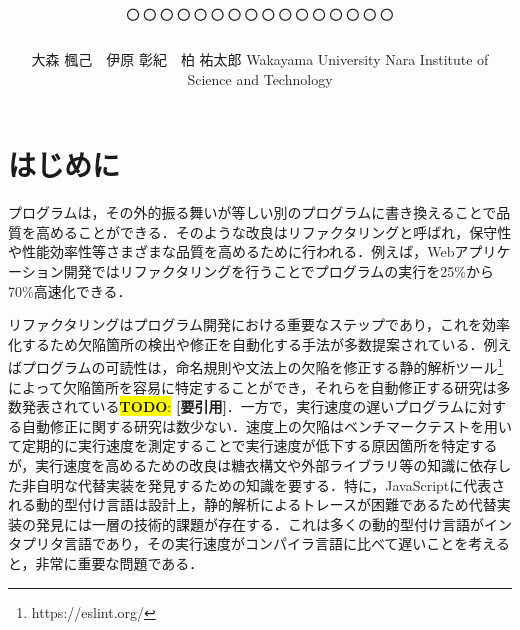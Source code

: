 \documentclass[T,J]{fose} %
\newcommand{\todo}[1]{\colorbox{yellow}{{\bf TODO}:}{\color{red} {\textbf{[#1]}}}}
\begin{document}
\title{○○○○○○○○○○○○○○○○}

\author{大森 楓己　伊原 彰紀　柏 祐太郎
\ejtitle{\etitle}
{Wakayama University}
{Nara Institute of Science and Technology}
}

\maketitle \thispagestyle {empty}

\section{はじめに}
プログラムは，その外的振る舞いが等しい別のプログラムに書き換えることで品質を高めることができる．そのような改良はリファクタリングと呼ばれ，保守性や性能効率性等さまざまな品質を高めるために行われる．例えば，Webアプリケーション開発ではリファクタリングを行うことでプログラムの実行を25\%から70\%高速化できる\cite{Selakovic_2016}．

リファクタリングはプログラム開発における重要なステップであり，これを効率化するため欠陥箇所の検出や修正を自動化する手法が多数提案されている．例えばプログラムの可読性は，命名規則や文法上の欠陥を修正する静的解析ツール\footnote{https://eslint.org/}によって欠陥箇所を容易に特定することができ，それらを自動修正する研究は多数発表されている\todo{要引用}．一方で，実行速度の遅いプログラムに対する自動修正に関する研究は数少ない．速度上の欠陥はベンチマークテストを用いて定期的に実行速度を測定することで実行速度が低下する原因箇所を特定するが，実行速度を高めるための改良は糖衣構文や外部ライブラリ等の知識に依存した非自明な代替実装を発見するための知識を要する．特に，JavaScriptに代表される動的型付け言語は設計上，静的解析によるトレースが困難であるため代替実装の発見には一層の技術的課題が存在する．これは多くの動的型付け言語がインタプリタ言語であり，その実行速度がコンパイラ言語に比べて遅いことを考えると，非常に重要な問題である．
\end{document}

